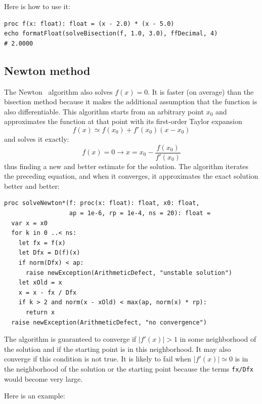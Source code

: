\documentclass[justified, sixbynine]{tufte-book}
\def\ft{\small\tt}
\theoremstyle{plain}%
\newtheorem * {corollary}{Corollary}
\theoremstyle{definition}
\theoremstyle{remark}
\newtheorem * {remark}{Remark}
\newtheorem * {note}{Note}
\begin{document}
\begin{fullwidth}
Here is how to use it:

\begin{lstlisting}
proc f(x: float): float = (x - 2.0) * (x - 5.0)
echo formatFloat(solveBisection(f, 1.0, 3.0), ffDecimal, 4)
# 2.0000
\end{lstlisting}

\goodbreak\subsection{Newton method}


The Newton~\cite{newton} algorithm also solves $f(x)=0$. It is faster (on average) than the bisection method because it makes the additional assumption that the function is also differentiable. This algorithm starts from an arbitrary point $x_0$ and approximates the function at that point with its first-order Taylor expansion
\begin{equation}
f(x) \simeq f(x_0) + f'(x_0)(x-x_0)
\end{equation}
and solves it exactly:
\begin{equation}
f(x) = 0 \rightarrow x = x_0 - \frac{f(x_0)}{f'(x_0)}
\end{equation}
thus finding a new and better estimate for the solution. The algorithm iterates the preceding equation, and when it converges, it approximates the exact solution better and better:

\begin{lstlisting}[caption={in file: {\ft nlib.nim}}]
proc solveNewton*(f: proc(x: float): float, x0: float,
                  ap = 1e-6, rp = 1e-4, ns = 20): float =
  var x = x0
  for k in 0 ..< ns:
    let fx = f(x)
    let Dfx = D(f)(x)
    if norm(Dfx) < ap:
      raise newException(ArithmeticDefect, "unstable solution")
    let xOld = x
    x = x - fx / Dfx
    if k > 2 and norm(x - xOld) < max(ap, norm(x) * rp):
      return x
  raise newException(ArithmeticDefect, "no convergence")
\end{lstlisting}

The algorithm is guaranteed to converge if $|f'(x)|>1$ in some neighborhood of the solution and if the starting point is in this neighborhood. It may also converge if this condition is not true. It is likely to fail when $|f'(x)|\simeq 0$ is in the neighborhood of the solution or the starting point because the terms {\ft fx/Dfx} would become very large.

Here is an example:


\end{fullwidth}
\end{document}
